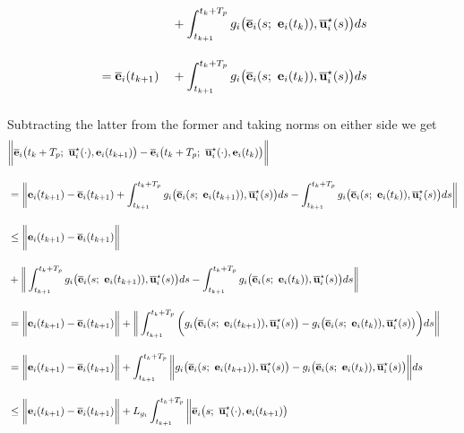 \begin{gg_box}
\begin{alignat}{2}
    &                      &&+ \int_{t_{k+1}}^{t_k + T_p} g_i\big(\overline{\vect{e}}_i(s;\ \vect{e}_i(t_k)), \overline{\vect{u}}_i^{\star}(s) \big)ds \\[2.5ex]
    &= \overline{\vect{e}}_i(t_{k+1}) &&+ \int_{t_{k+1}}^{t_k + T_p} g_i\big(\overline{\vect{e}}_i(s;\ \vect{e}_i(t_k)), \overline{\vect{u}}_i^{\star}(s) \big)ds \\[2.5ex]
\end{alignat}
Subtracting the latter from the former and taking norms on either side we get
\begin{alignat}{2}
  &\bigg \|\overline{\vect{e}}_i\big(t_k + T_p;\ \overline{\vect{u}}_i^{\star}(\cdot), \vect{e}_i(t_{k+1})\big)
    - \overline{\vect{e}}_i\big(t_k + T_p;\ \overline{\vect{u}}_i^{\star}(\cdot), \vect{e}_i(t_k)\big) \bigg\| \\[2.5ex]
  &= \bigg \| \vect{e}_i(t_{k+1}) - \overline{\vect{e}}_i(t_{k+1})
  + \int_{t_{k+1}}^{t_k + T_p} g_i\big(\overline{\vect{e}}_i(s;\ \vect{e}_i(t_{k+1})), \overline{\vect{u}}_i^{\star}(s) \big)ds
    - \int_{t_{k+1}}^{t_k + T_p} g_i\big(\overline{\vect{e}}_i(s;\ \vect{e}_i(t_k)), \overline{\vect{u}}_i^{\star}(s) \big)ds \bigg \| \\[2.5ex]
  &\leq \bigg \| \vect{e}_i(t_{k+1}) - \overline{\vect{e}}_i(t_{k+1}) \bigg\| \\[2.5ex]
  &+ \bigg \| \int_{t_{k+1}}^{t_k + T_p} g_i\big(\overline{\vect{e}}_i(s;\ \vect{e}_i(t_{k+1})), \overline{\vect{u}}_i^{\star}(s) \big)ds
    - \int_{t_{k+1}}^{t_k + T_p} g_i\big(\overline{\vect{e}}_i(s;\ \vect{e}_i(t_k)), \overline{\vect{u}}_i^{\star}(s) \big)ds \bigg \| \\[2.5ex]
  &= \bigg \| \vect{e}_i(t_{k+1}) - \overline{\vect{e}}_i(t_{k+1}) \bigg\|
  + \bigg \| \int_{t_{k+1}}^{t_k + T_p} \bigg( g_i\big(\overline{\vect{e}}_i(s;\ \vect{e}_i(t_{k+1})), \overline{\vect{u}}_i^{\star}(s) \big)
  -  g_i\big(\overline{\vect{e}}_i(s;\ \vect{e}_i(t_k)), \overline{\vect{u}}_i^{\star}(s) \big) \bigg) ds \bigg \| \\[2.5ex]
  &= \bigg \| \vect{e}_i(t_{k+1}) - \overline{\vect{e}}_i(t_{k+1}) \bigg\|
  +  \int_{t_{k+1}}^{t_k + T_p} \bigg\| g_i\big(\overline{\vect{e}}_i(s;\ \vect{e}_i(t_{k+1})), \overline{\vect{u}}_i^{\star}(s) \big)
  -  g_i\big(\overline{\vect{e}}_i(s;\ \vect{e}_i(t_k)), \overline{\vect{u}}_i^{\star}(s) \big) \bigg\| ds \\[2.5ex]
  &\leq \bigg \| \vect{e}_i(t_{k+1}) - \overline{\vect{e}}_i(t_{k+1}) \bigg\|
  +  L_{g_i} \int_{t_{k+1}}^{t_k + T_p} \bigg\| \overline{\vect{e}}_i\big(s;\ \overline{\vect{u}}_i^{\star}(\cdot), \vect{e}_i(t_{k+1})\big)

\end{alignat}
\end{gg_box}
